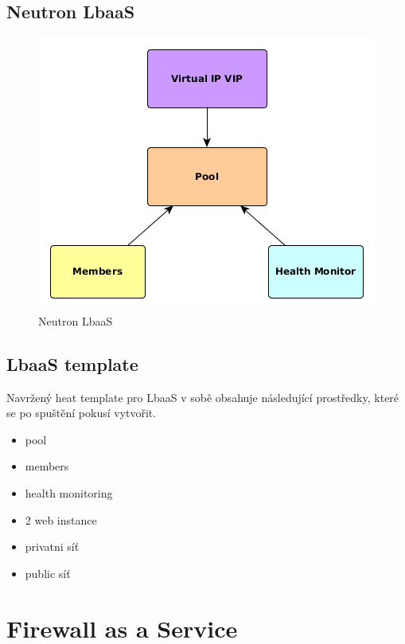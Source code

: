 \subsection{Neutron LbaaS}

\begin{figure}[h]
\begin{centering}
\includegraphics[scale=0.63]{images/NeutronLbaaS}
\par\end{centering}
\caption{Neutron LbaaS\label{fig:NeutronLbaaS}}
\end{figure}


\subsection{LbaaS template}

Navržený heat template pro LbaaS v sobě obsahuje následující prostředky, které se po spuštění pokusí vytvořit.

\begin{itemize}
\item pool
\item members
\item health monitoring
\item 2 web instance
\item privatni síť
\item public síť
\end{itemize}



\section{Firewall as a Service}

